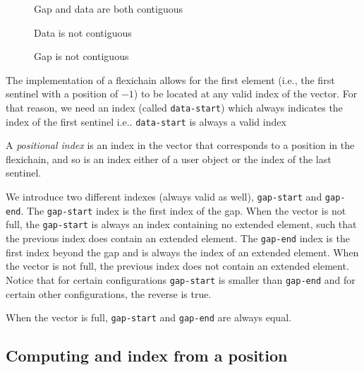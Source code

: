 \documentclass[11pt]{article}
\def\inputfig#1{}
\begin{document}
\begin{figure}
\begin{center}
\inputfig{gap1.pstex_t}
\end{center}
\caption{\label{fig-both-contiguous} Gap and data are both contiguous}
\end{figure}

\begin{figure}
\begin{center}
\inputfig{gap2.pstex_t}
\end{center}
\caption{\label{fig-data-not-contiguous} Data is not contiguous}
\end{figure}

\begin{figure}
\begin{center}
\inputfig{gap3.pstex_t}
\end{center}
\caption{\label{fig-gap-not-contiguous} Gap is not contiguous}
\end{figure}

The implementation of a flexichain allows for the first element (i.e.,
the first sentinel with a position of $-1$) to be located at any valid
index of the vector.  For that reason, we need an index (called
\texttt{data-start}) which always indicates the index of the first
sentinel i.e.. \texttt{data-start} is always a valid index

A \textit{positional index} is an index in the vector that corresponds
to a position in the flexichain, and so is an index either of a user
object or the index of the last sentinel. 

We introduce two different indexes (always valid as well),
\texttt{gap-start} and \texttt{gap-end}.  The \texttt{gap-start} index
is the first index of the gap.  When the vector is not full, the
\texttt{gap-start} is always an index containing no extended element,
such that the previous index does contain an extended element. The
\texttt{gap-end} index is the first index beyond the gap and is always
the index of an extended element.  When the vector is not full, the
previous index does not contain an extended element.  Notice that for
certain configurations \texttt{gap-start} is smaller than
\texttt{gap-end} and for certain other configurations, the reverse is
true.

When the vector is full, \texttt{gap-start} and \texttt{gap-end} are
always equal.

\subsection{Computing and index from a position}
\end{document}
